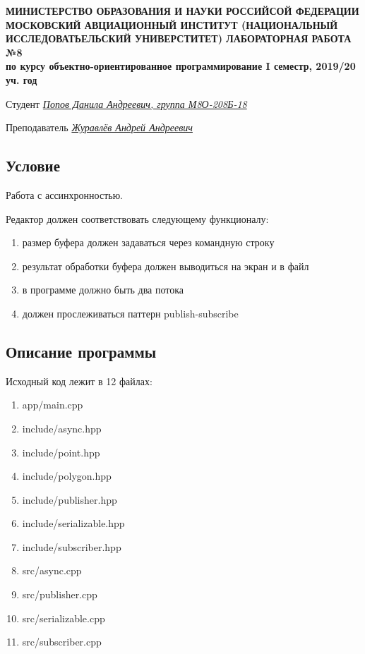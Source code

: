 \documentclass[12pt]{article}
\begin{document}
\begin{titlepage}
\begin{center}
\textbf{МИНИСТЕРСТВО ОБРАЗОВАНИЯ И НАУКИ РОССИЙСОЙ ФЕДЕРАЦИИ
\medskip
МОСКОВСКИЙ АВЦИАЦИОННЫЙ ИНСТИТУТ
(НАЦИОНАЛЬНЫЙ ИССЛЕДОВАТЬЕЛЬСКИЙ УНИВЕРСТИТЕТ)
\vfill\vfill
{\Huge ЛАБОРАТОРНАЯ РАБОТА №8} \\
по курсу объектно-ориентированное программирование
I семестр, 2019/20 уч. год}
\end{center}
\vfill

Студент \uline{\it {Попов Данила Андреевич, группа М8О-208Б-18}\hfill}

Преподаватель \uline{\it {Журавлёв Андрей Андреевич}\hfill}

\vfill
\end{titlepage}

\subsection*{Условие}

Работа с ассинхронностью.

Редактор должен соответствовать следующему функционалу:
\begin{enumerate}
\item размер буфера должен задаваться через командную строку
\item результат обработки буфера должен выводиться на экран и в файл
\item в программе должно быть два потока
\item должен прослеживаться паттерн publish-subscribe
\end{enumerate}

\subsection*{Описание программы}

Исходный код лежит в 12 файлах:
\begin{enumerate}
\item app/main.cpp
\item include/async.hpp
\item include/point.hpp
\item include/polygon.hpp
\item include/publisher.hpp
\item include/serializable.hpp
\item include/subscriber.hpp
\item src/async.cpp
\item src/publisher.cpp
\item src/serializable.cpp
\item src/subscriber.cpp
\end{enumerate}
\end{document}
